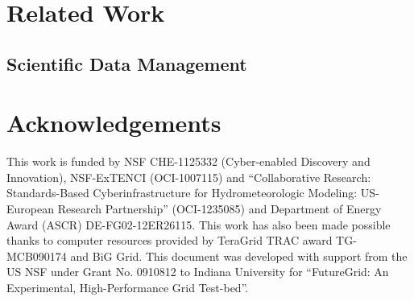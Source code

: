 \documentclass{sig-alternate}
\begin{document}
\section{Related Work}


\subsection{Scientific Data Management}



\section*{Acknowledgements}
This work is funded by NSF CHE-1125332 (Cyber-enabled Discovery and
Innovation), NSF-ExTENCI (OCI-1007115) and ``Collaborative Research:
Standards-Based Cyberinfrastructure for Hydrometeorologic Modeling:
US-European Research Partnership'' (OCI-1235085) and Department of
Energy Award (ASCR) DE-FG02-12ER26115.  This work has also been made
possible thanks to computer resources provided by TeraGrid TRAC award
TG-MCB090174 and BiG Grid.  This document was developed with support
from the US NSF under Grant No. 0910812 to Indiana University for
``FutureGrid: An Experimental, High-Performance Grid Test-bed''.

% 


\end{document}
